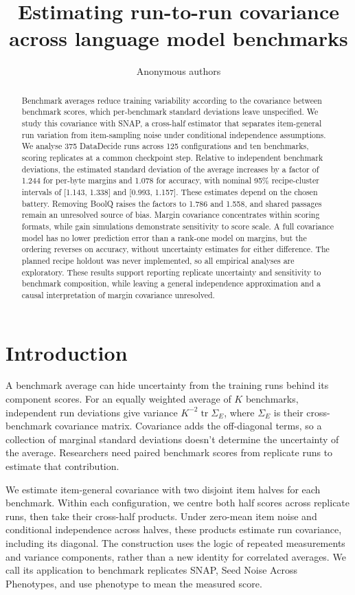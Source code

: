 \documentclass{article}
\title{Estimating run-to-run covariance across language model benchmarks}
\author{Anonymous authors}
\newcommand{\Sig}{\Sigma_E}
\begin{document}
\maketitle
\begin{abstract}
Benchmark averages reduce training variability according to the covariance between benchmark scores, which per-benchmark standard deviations leave unspecified. We study this covariance with SNAP, a cross-half estimator that separates item-general run variation from item-sampling noise under conditional independence assumptions. We analyse 375 DataDecide runs across 125 configurations and ten benchmarks, scoring replicates at a common checkpoint step. Relative to independent benchmark deviations, the estimated standard deviation of the average increases by a factor of 1.244 for per-byte margins and 1.078 for accuracy, with nominal 95\% recipe-cluster intervals of [1.143, 1.338] and [0.993, 1.157]. These estimates depend on the chosen battery. Removing BoolQ raises the factors to 1.786 and 1.558, and shared passages remain an unresolved source of bias. Margin covariance concentrates within scoring formats, while gain simulations demonstrate sensitivity to score scale. A full covariance model has no lower prediction error than a rank-one model on margins, but the ordering reverses on accuracy, without uncertainty estimates for either difference. The planned recipe holdout was never implemented, so all empirical analyses are exploratory. These results support reporting replicate uncertainty and sensitivity to benchmark composition, while leaving a general independence approximation and a causal interpretation of margin covariance unresolved.
\end{abstract}

\section{Introduction}
A benchmark average can hide uncertainty from the training runs behind its component scores. For an equally weighted average of $K$ benchmarks, independent run deviations give variance $K^{-2}\operatorname{tr}\Sig$, where $\Sig$ is their cross-benchmark covariance matrix. Covariance adds the off-diagonal terms, so a collection of marginal standard deviations doesn't determine the uncertainty of the average. Researchers need paired benchmark scores from replicate runs to estimate that contribution.

We estimate item-general covariance with two disjoint item halves for each benchmark. Within each configuration, we centre both half scores across replicate runs, then take their cross-half products. Under zero-mean item noise and conditional independence across halves, these products estimate run covariance, including its diagonal. The construction uses the logic of repeated measurements and variance components, rather than a new identity for correlated averages. We call its application to benchmark replicates SNAP, Seed Noise Across Phenotypes, and use phenotype to mean the measured score.
\end{document}
